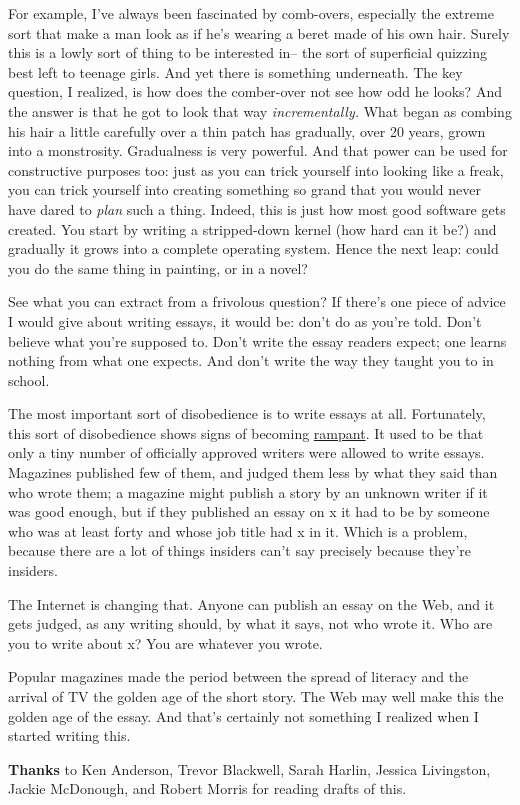 For example, I've always been fascinated by comb-overs, especially the
extreme sort that make a man look as if he's wearing a beret made of his
own hair. Surely this is a lowly sort of thing to be interested in-- the
sort of superficial quizzing best left to teenage girls. And yet there
is something underneath. The key question, I realized, is how does the
comber-over not see how odd he looks? And the answer is that he got to
look that way \emph{incrementally.} What began as combing his hair a
little carefully over a thin patch has gradually, over 20 years, grown
into a monstrosity. Gradualness is very powerful. And that power can be
used for constructive purposes too: just as you can trick yourself into
looking like a freak, you can trick yourself into creating something so
grand that you would never have dared to \emph{plan} such a thing.
Indeed, this is just how most good software gets created. You start by
writing a stripped-down kernel (how hard can it be?) and gradually it
grows into a complete operating system. Hence the next leap: could you
do the same thing in painting, or in a novel?

See what you can extract from a frivolous question? If there's one piece
of advice I would give about writing essays, it would be: don't do as
you're told. Don't believe what you're supposed to. Don't write the
essay readers expect; one learns nothing from what one expects. And
don't write the way they taught you to in school.

The most important sort of disobedience is to write essays at all.
Fortunately, this sort of disobedience shows signs of becoming
\href{http://www.ojr.org/ojr/glaser/1056050270.php}{rampant}. It used to
be that only a tiny number of officially approved writers were allowed
to write essays. Magazines published few of them, and judged them less
by what they said than who wrote them; a magazine might publish a story
by an unknown writer if it was good enough, but if they published an
essay on x it had to be by someone who was at least forty and whose job
title had x in it. Which is a problem, because there are a lot of things
insiders can't say precisely because they're insiders.

The Internet is changing that. Anyone can publish an essay on the Web,
and it gets judged, as any writing should, by what it says, not who
wrote it. Who are you to write about x? You are whatever you wrote.

Popular magazines made the period between the spread of literacy and the
arrival of TV the golden age of the short story. The Web may well make
this the golden age of the essay. And that's certainly not something I
realized when I started writing this.


\textbf{Thanks} to Ken Anderson, Trevor Blackwell, Sarah Harlin, Jessica
Livingston, Jackie McDonough, and Robert Morris for reading drafts of
this.